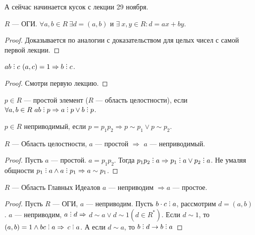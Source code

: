 А сейчас начинается кусок с лекции 29 ноября.
\begin{statement}
    $R$ --- ОГИ.  $\forall a, b \in R \  \exists d = (a, b)$ и  $\exists\!\  x, y \in R: d = ax+by$.
\end{statement}
\begin{proof}
    Доказывается по аналогии с доказательством для целых чисел с самой первой лекции.
\end{proof}
\begin{statement}
    $ab \divby c\ (a, c) = 1 \Rightarrow b \divby c$.
\end{statement}
\begin{proof}
    Смотри первую лекцию.
\end{proof}
\begin{definition}
    $p \in R$ --- простой элемент ($R$ --- область целостности), если $\forall a,b \in R\ ab \divby p \Rightarrow a \divby p \lor b \divby p$.
\end{definition}
\begin{definition}
    $p \in R$ неприводимый, если  $p=p_1p_2 \Rightarrow p \sim p_1 \lor p \sim p_2$.
\end{definition}
\begin{statement}
    $R$ --- Область целостности, $a$ --- простой  $\Rightarrow$  $a$ --- неприводимый.
\end{statement}
\begin{proof}
	Пусть $a$ --- простой.  $a = p_1 p_2$. Тогда $p_1 p_2 \divby a \Rightarrow p_1 \divby a \lor p_2 \divby a$.  Не умаляя общности $p_1 \divby a \land a \divby p_1 \Rightarrow a \sim p_1$. 
\end{proof}

\begin{statement}
     $R$ --- Область Главных Идеалов  $a$ --- неприводим  $\Rightarrow a$ --- простое.
\end{statement}
\begin{proof}
	Пусть $R$ --- ОГИ,  $a$ --- неприводим. Пусть $b \cdot c \divby a$, рассмотрим $d = (a, b)$. $a$ --- неприводим, $a \divby d \Rightarrow$ $d \sim a \lor d \sim 1 (d \in R^*)$. Если $d \sim 1$, то $(a, b) = 1 \land b c \divby a \Rightarrow$ $c \divby a$. А если $d \sim a$, то $b \divby d \to b \divby a$
\end{proof}

